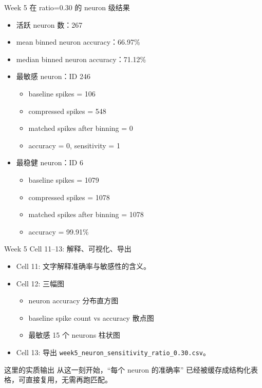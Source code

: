 \documentclass[aspectratio=169,11pt]{beamer}
\begin{document}
\begin{frame}{Week 5 在 ratio=0.30 的 neuron 级结果}
  \begin{itemize}
    \item 活跃 neuron 数：267
    \item mean binned neuron accuracy：66.97\%
    \item median binned neuron accuracy：71.12\%
    \item 最敏感 neuron：ID 246
    \begin{itemize}
      \item baseline spikes = 106
      \item compressed spikes = 548
      \item matched spikes after binning = 0
      \item accuracy = 0, sensitivity = 1
    \end{itemize}
    \item 最稳健 neuron：ID 6
    \begin{itemize}
      \item baseline spikes = 1079
      \item compressed spikes = 1078
      \item matched spikes after binning = 1078
      \item accuracy = 99.91\%
    \end{itemize}
  \end{itemize}
\end{frame}

\begin{frame}{Week 5 Cell 11--13: 解释、可视化、导出}
  \begin{itemize}
    \item Cell 11: 文字解释准确率与敏感性的含义。
    \item Cell 12: 三幅图
    \begin{itemize}
      \item neuron accuracy 分布直方图
      \item baseline spike count vs accuracy 散点图
      \item 最敏感 15 个 neurons 柱状图
    \end{itemize}
    \item Cell 13: 导出 \texttt{week5\_neuron\_sensitivity\_ratio\_0.30.csv}。
  \end{itemize}
  \begin{block}{这里的实质输出}
    从这一刻开始，``每个 neuron 的准确率'' 已经被缓存成结构化表格，可直接复用，无需再跑匹配。
  \end{block}
\end{frame}
\end{document}
